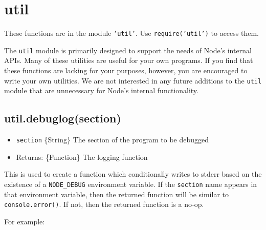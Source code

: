 \section{util}\label{util}

\begin{Shaded}
\begin{Highlighting}[]
 
\end{Highlighting}
\end{Shaded}

These functions are in the module \texttt{'util'}. Use
\texttt{require('util')} to access them.

The \texttt{util} module is primarily designed to support the needs of
Node's internal APIs. Many of these utilities are useful for your own
programs. If you find that these functions are lacking for your
purposes, however, you are encouraged to write your own utilities. We
are not interested in any future additions to the \texttt{util} module
that are unnecessary for Node's internal functionality.

\subsection{util.debuglog(section)}\label{util.debuglogsection}

\begin{itemize}
\itemsep1pt\parskip0pt
\item
  \texttt{section} \{String\} The section of the program to be debugged
\item
  Returns: \{Function\} The logging function
\end{itemize}

This is used to create a function which conditionally writes to stderr
based on the existence of a \texttt{NODE\_DEBUG} environment variable.
If the \texttt{section} name appears in that environment variable, then
the returned function will be similar to \texttt{console.error()}. If
not, then the returned function is a no-op.

For example:

\begin{Shaded}
\end{Shaded}

